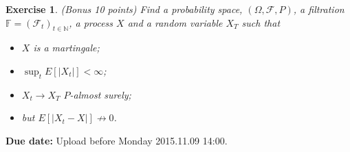 \documentclass[DIV=classic,a4paper,10pt]{scrartcl}
\newtheorem{exercise}[theorem]{Exercise}
\theoremstyle{nonumberplain}
\newtheorem{proof}{Proof}
\numberwithin{equation}{section}
\begin{document}
\begin{exercise}(Bonus 10 points)
    Find a probability space, $(\Omega, \mathcal{F},P)$, a filtration $\mathbb{F}=(\mathcal{F}_t)_{t\in \mathbb{N}}$, a process $X$ and a random variable $X_T$ such that
    \begin{itemize}
        \item $X$ is a martingale;
        \item $\sup_t E[|X_t|]<\infty$;
        \item $X_t\to X_T$ $P$-almost surely;
        \item but $E[|X_t-X|]\not \to 0$.
    \end{itemize}
\end{exercise}



    


\smallskip
\noindent
\textbf{Due date:} Upload before Monday 2015.11.09 14:00.
\end{document}
